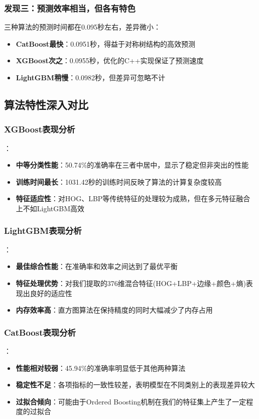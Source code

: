 \documentclass[UTF8]{report}
\theoremstyle{MyLineTheoremStyle} %
\theoremstyle{MyBlockTheoremStyle} %
\theoremstyle{MySubsubsectionStyle} %
\begin{document}
\subsubsection{发现三：预测效率相当，但各有特色}
三种算法的预测时间都在0.095秒左右，差异微小：
\begin{itemize}
    \item \textbf{CatBoost最快}：0.0951秒，得益于对称树结构的高效预测
    \item \textbf{XGBoost次之}：0.0955秒，优化的C++实现保证了预测速度
    \item \textbf{LightGBM稍慢}：0.0982秒，但差异可忽略不计
\end{itemize}

\subsection{算法特性深入对比}
\subsubsection{XGBoost表现分析}：
\begin{itemize}
    \item \textbf{中等分类性能}：50.74\%的准确率在三者中居中，显示了稳定但非突出的性能
    \item \textbf{训练时间最长}：1031.42秒的训练时间反映了算法的计算复杂度较高
    \item \textbf{特征适应性}：对HOG、LBP等传统特征的处理较为成熟，但在多元特征融合上不如LightGBM高效
\end{itemize}

\subsubsection{LightGBM表现分析}：
\begin{itemize}
    \item \textbf{最佳综合性能}：在准确率和效率之间达到了最优平衡
    \item \textbf{特征处理优势}：对我们提取的376维混合特征(HOG+LBP+边缘+颜色+熵)表现出良好的适应性
    \item \textbf{内存效率高}：直方图算法在保持精度的同时大幅减少了内存占用
\end{itemize}

\subsubsection{CatBoost表现分析}：
\begin{itemize}
    \item \textbf{性能相对较弱}：45.94\%的准确率明显低于其他两种算法
    \item \textbf{稳定性不足}：各项指标的一致性较差，表明模型在不同类别上的表现差异较大
    \item \textbf{过拟合倾向}：可能由于Ordered Boosting机制在我们的特征集上产生了一定程度的过拟合
\end{itemize}
\end{document}
